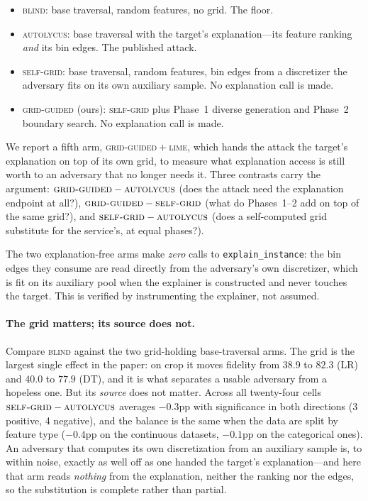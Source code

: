 \documentclass[sigconf,anonymous,review]{acmart}
\begin{document}
\begin{itemize}
  \item \textsc{blind}: base traversal, random features, no grid. The floor.
  \item \textsc{autolycus}: base traversal with the target's explanation---its feature ranking
  \emph{and} its bin edges. The published attack.
  \item \textsc{self-grid}: base traversal, random features, bin edges from a discretizer the
  adversary fits on its own auxiliary sample. No explanation call is made.
  \item \textsc{grid-guided} (ours): \textsc{self-grid} plus Phase~1 diverse generation and
  Phase~2 boundary search. No explanation call is made.
\end{itemize}

We report a fifth arm, \textsc{grid-guided}${}+{}$\textsc{lime}, which hands the attack the target's
explanation on top of its own grid, to measure what explanation access is still worth to an adversary
that no longer needs it. Three contrasts carry the argument:
$\textsc{grid-guided}-\textsc{autolycus}$ (does the attack need the explanation endpoint at all?),
$\textsc{grid-guided}-\textsc{self-grid}$ (what do Phases~1--2 add on top of the same grid?), and
$\textsc{self-grid}-\textsc{autolycus}$ (does a self-computed grid substitute for the service's, at
equal phases?).

The two explanation-free arms make \emph{zero} calls to \texttt{explain\_instance}: the bin edges they
consume are read directly from the adversary's own discretizer, which is fit on its auxiliary pool
when the explainer is constructed and never touches the target. This is verified by instrumenting the
explainer, not assumed.


\paragraph{The grid matters; its source does not.} Compare \textsc{blind} against the two
grid-holding base-traversal arms. The grid is the largest single effect in the paper: on crop it moves
fidelity from $38.9$ to $82.3$ (LR) and $40.0$ to $77.9$ (DT), and it is what separates a usable
adversary from a hopeless one. But its \emph{source} does not matter. Across all twenty-four cells
$\textsc{self-grid}-\textsc{autolycus}$ averages $-0.3$pp with significance in both directions
(3 positive, 4 negative), and the balance is the same when the data are split by feature type
($-0.4$pp on the continuous datasets, $-0.1$pp on the categorical ones). An adversary that computes
its own discretization from an auxiliary sample is, to within noise, exactly as well off as one handed
the target's explanation---and here that arm reads \emph{nothing} from the explanation, neither the
ranking nor the edges, so the substitution is complete rather than partial.
\end{document}
